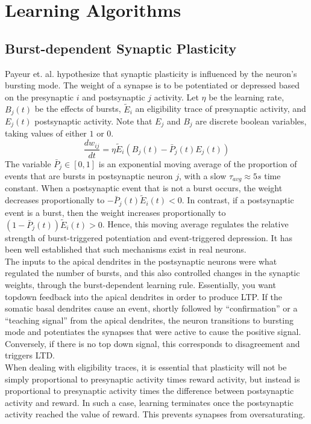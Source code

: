 \documentclass[11pt, a4paper]{article}
\begin{document}
\section{Learning Algorithms}
\subsection{Burst-dependent Synaptic Plasticity}
Payeur et. al. hypothesize that synaptic plasticity is influenced by the neuron's bursting mode. The weight of a synapse is to be potentiated or depressed based on the presynaptic $i$ and postsynaptic $j$ activity. Let $\eta$ be the learning rate, $B_j(t)$ be the effects of bursts, $\tilde{E}_i$ an eligibility trace of presynaptic activity, and $E_j(t)$ postsynaptic activity. Note that $E_j$ and $B_j$ are discrete boolean variables, taking values of either $1$ or $0$.
\begin{equation}
    \frac{dw_{ij}}{dt} = \eta \tilde{E}_i(B_j(t) - \bar{P}_j(t)E_j(t))
\end{equation}
The variable $\bar{P}_j \in [ 0,1 ]$ is an exponential moving average of the proportion of events that are bursts in postsynaptic neuron $j$, with a slow $\tau_{avg} \approx 5s$ time constant. When a postsynaptic event that is not a burst occurs, the weight decreases proportionally to $-\bar{P}_j(t) \tilde{E}_i(t) < 0$. In contrast, if a postsynaptic event is a burst, then the weight increases proportionally to $(1- \bar{P}_j(t)) \tilde{E}_i(t) > 0$.
Hence, this moving average regulates the relative strength of burst-triggered potentiation and event-triggered depression. It has been well established that such mechanisms exist in real neurons. \\

The inputs to the apical dendrites in the postsynaptic neurons were what regulated the number of bursts, and this also controlled changes in the synaptic weights, through the burst-dependent learning rule. Essentially, you want topdown feedback into the apical dendrites in order to produce LTP. If the somatic basal dendrites cause an event, shortly followed by ``confirmation'' or a ``teaching signal'' from the apical dendrites, the neuron transitions to bursting mode and potentiates the synapses that were active to cause the positive signal. Conversely, if there is no top down signal, this corresponds to disagreement and triggers LTD. \\

When dealing with eligibility traces, it is essential that plasticity will not be simply proportional to presynaptic activity times reward activity, but instead is proportional to presynaptic activity times the difference between postsynaptic activity and reward. In such a case, learning terminates once the postsynaptic activity reached the value of reward. This prevents synapses from oversaturating. 
\end{document}
